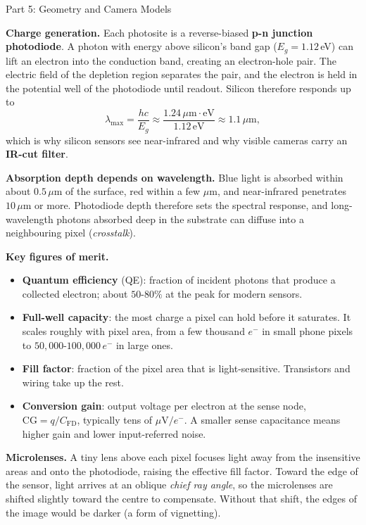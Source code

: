 \documentclass[letterpaper]{article}
\begin{document}
\begin{notes}{Part 5: Geometry and Camera Models}

\textbf{Charge generation.} Each photosite is a reverse-biased \textbf{p-n junction photodiode}. A photon with energy above silicon's band gap ($E_g = 1.12$\,eV) can lift an electron into the conduction band, creating an electron-hole pair. The electric field of the depletion region separates the pair, and the electron is held in the potential well of the photodiode until readout. Silicon therefore responds up to
$$\lambda_{\max} = \frac{hc}{E_g} \approx \frac{1.24\,\mu\text{m}\cdot\text{eV}}{1.12\,\text{eV}} \approx 1.1\,\mu\text{m},$$
which is why silicon sensors see near-infrared and why visible cameras carry an \textbf{IR-cut filter}.

\textbf{Absorption depth depends on wavelength.} Blue light is absorbed within about $0.5\,\mu$m of the surface, red within a few $\mu$m, and near-infrared penetrates $10\,\mu$m or more. Photodiode depth therefore sets the spectral response, and long-wavelength photons absorbed deep in the substrate can diffuse into a neighbouring pixel (\emph{crosstalk}).

\textbf{Key figures of merit.}
\begin{itemize}[noitemsep]
    \item \textbf{Quantum efficiency} (QE): fraction of incident photons that produce a collected electron; about $50$-$80\%$ at the peak for modern sensors.
    \item \textbf{Full-well capacity}: the most charge a pixel can hold before it saturates. It scales roughly with pixel area, from a few thousand $e^-$ in small phone pixels to $50{,}000$-$100{,}000\,e^-$ in large ones.
    \item \textbf{Fill factor}: fraction of the pixel area that is light-sensitive. Transistors and wiring take up the rest.
    \item \textbf{Conversion gain}: output voltage per electron at the sense node, $\mathrm{CG} = q/C_{\mathrm{FD}}$, typically tens of $\mu$V$/e^-$. A smaller sense capacitance means higher gain and lower input-referred noise.
\end{itemize}

\textbf{Microlenses.} A tiny lens above each pixel focuses light away from the insensitive areas and onto the photodiode, raising the effective fill factor. Toward the edge of the sensor, light arrives at an oblique \emph{chief ray angle}, so the microlenses are shifted slightly toward the centre to compensate. Without that shift, the edges of the image would be darker (a form of vignetting).


\end{notes}
\end{document}

